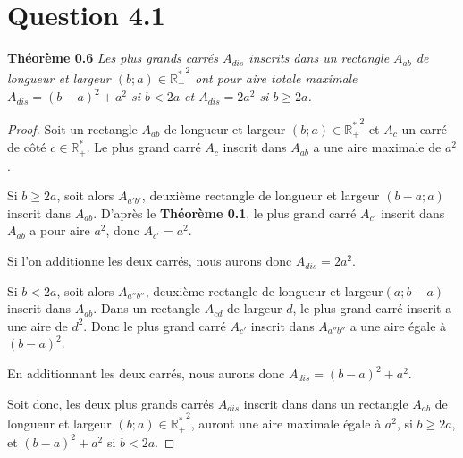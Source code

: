 \documentclass[]{amsart}
\theoremstyle{definition}
\theoremstyle{remark}
\numberwithin{equation}{section}
\begin{document}
\section*{Question 4.1}
\textbf{Théorème 0.6} \emph{Les plus grands carrés $A_{dis}$ inscrits dans un rectangle $A_{ab}$ de longueur et largeur $(b;a)\in\mathbb{R_{+}^{\ast}}^2$ ont pour aire totale maximale $A_{dis}=(b-a)^2+a^2$ si $b<2a$ et $A_{dis}=2a^2$ si $b\geq2a$.}

\begin{proof}
Soit un rectangle $A_{ab}$ de longueur et largeur $(b;a)\in\mathbb{R_{+}^{\ast}}^2$ et $A_c$ un carré de côté $c\in\mathbb{R_{+}^{\ast}}$. Le plus grand carré $A_c$ inscrit dans $A_{ab}$ a une aire maximale de $a^2$.

Si $b\geq2a$, soit alors $A_{a'b'}$, deuxième rectangle de longueur et largeur $(b-a;a)$ inscrit dans $A_{ab}$. D'après le \textbf{Théorème 0.1}, le plus grand carré $A_{c'}$ inscrit dans $A_{ab}$ a pour aire $a^2$, donc $A_{c'}=a^2$.

Si l'on additionne les deux carrés, nous aurons donc $A_{dis}=2a^2$.

Si $b<2a$, soit alors $A_{a''b''}$, deuxième rectangle de longueur et largeur$(a;b-a)$ inscrit dans $A_{ab}$. Dans un rectangle $A_{cd}$ de largeur $d$, le plus grand carré inscrit a une aire de $d^2$. Donc le plus grand carré $A_{c'}$ inscrit dans $A_{a''b''}$ a une aire égale à $(b-a)^2$. 

En additionnant les deux carrés, nous aurons donc $A_{dis}=(b-a)^2+a^2$.

Soit donc, les deux plus grands carrés $A_{dis}$ inscrit dans dans un rectangle $A_{ab}$ de longueur et largeur $(b;a)\in\mathbb{R_{+}^{\ast}}^2$, auront une aire maximale égale à $a^2$, si $b\geq2a$, et $(b-a)^2+a^2$ si $b<2a$.


\hspace{1.7cm}
\end{proof}
\end{document}
